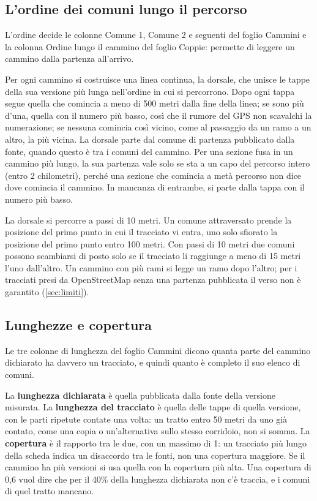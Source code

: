 \subsection{L'ordine dei comuni lungo il percorso}\label{sec:ordine}

L'ordine decide le colonne Comune 1, Comune 2 e seguenti del foglio Cammini e la colonna Ordine lungo il cammino del foglio Coppie: permette di leggere un cammino dalla partenza all'arrivo.

Per ogni cammino si costruisce una linea continua, la dorsale, che unisce le tappe della sua versione più lunga nell'ordine in cui si percorrono. Dopo ogni tappa segue quella che comincia a meno di 500 metri dalla fine della linea; se sono più d'una, quella con il numero più basso, così che il rumore del GPS non scavalchi la numerazione; se nessuna comincia così vicino, come al passaggio da un ramo a un altro, la più vicina. La dorsale parte dal comune di partenza pubblicato dalla fonte, quando questo è tra i comuni del cammino. Per una sezione fusa in un cammino più lungo, la sua partenza vale solo se sta a un capo del percorso intero (entro 2 chilometri), perché una sezione che comincia a metà percorso non dice dove comincia il cammino. In mancanza di entrambe, si parte dalla tappa con il numero più basso.

La dorsale si percorre a passi di 10 metri. Un comune attraversato prende la posizione del primo punto in cui il tracciato vi entra, uno solo sfiorato la posizione del primo punto entro 100 metri. Con passi di 10 metri due comuni possono scambiarsi di posto solo se il tracciato li raggiunge a meno di 15 metri l'uno dall'altro. Un cammino con più rami si legge un ramo dopo l'altro; per i tracciati presi da OpenStreetMap senza una partenza pubblicata il verso non è garantito (\cref{sec:limiti}).

\subsection{Lunghezze e copertura}\label{sec:lunghezze}

Le tre colonne di lunghezza del foglio Cammini dicono quanta parte del cammino dichiarato ha davvero un tracciato, e quindi quanto è completo il suo elenco di comuni.

La \textbf{lunghezza dichiarata} è quella pubblicata dalla fonte della versione misurata. La \textbf{lunghezza del tracciato} è quella delle tappe di quella versione, con le parti ripetute contate una volta: un tratto entro 50 metri da uno già contato, come una copia o un'alternativa sullo stesso corridoio, non si somma. La \textbf{copertura} è il rapporto tra le due, con un massimo di 1: un tracciato più lungo della scheda indica un disaccordo tra le fonti, non una copertura maggiore. Se il cammino ha più versioni si usa quella con la copertura più alta. Una copertura di 0,6 vuol dire che per il 40\% della lunghezza dichiarata non c'è traccia, e i comuni di quel tratto mancano.

